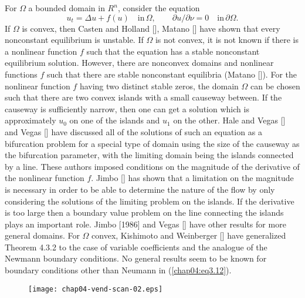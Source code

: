 \documentclass{surv-l}
\theoremstyle{plain}
\theoremstyle{definition}
\numberwithin{equation}{section}
\numberwithin{figure}{chapter}
\renewcommand\theequation{\arabic{section}.\arabic{equation}}
\begin{document}
For $\Omega$ a bounded domain in $R^{n}$, consider the equation
\renewcommand\theequation{\arabic{section}.\arabic{equation}}
\begin{equation}\label{chap04:eq3.12}
u_{t}=\Delta u+f(u)\quad \mathrm{in}\, \Omega,\qquad \partial u/\partial \nu=0\quad \mathrm{in}\, \partial\Omega.
\end{equation}
If $\Omega$ is convex, then Casten and Holland [\citeyear{1978ch}], Matano [\citeyear{1979m}] have shown that every nonconstant equilibrium is unstable. If $\Omega$ is not convex, it is not known if there is a nonlinear function $f$ such that the equation has a stable nonconstant equilibrium solution. However, there are nonconvex domains and nonlinear functions $f$ such that there are stable nonconstant equilibria (Matano [\citeyear{1979m}]). For the nonlinear function $f$ having two distinct stable zeros, the domain $\Omega$ can be chosen such that there are two convex islands with a small causeway between. If the causeway is sufficiently narrow, then one can get a solution which is approximately $u_{0}$ on one of the islands and $u_{1}$ on the other. Hale and Vegas [\citeyear{1984hv}] and Vegas [\citeyear{1983v}] have discussed all of the solutions of such an equation as a bifurcation problem for a special type of domain using the size of the causeway as the bifurcation parameter, with the limiting domain being the islands connected by a line. These authors imposed conditions on the magnitude of the derivative of the nonlinear function $f$. Jimbo [\citeyear{1988j}] has shown that a limitation on the magnitude is necessary in order to be able to determine the nature of the flow by only considering the solutions of the limiting problem on the islands. If the derivative is too large then a boundary value problem on the line connecting the islands plays an important role. Jimbo [1986] and Vegas [\citeyear{1986v}] have other results for more general domains. For $\Omega$ convex, Kishimoto and Weinberger [\citeyear{1985kw}] have generalized Theorem 4.3.2 to the case of variable coefficients and the analogue of the Newmann boundary conditions. No general results seem to be known for boundary conditions other than Neumann in (\ref{chap04:eq3.12}).

\setcounter{figure}{0}
\renewcommand\thefigure{\arabic{section}.\arabic{figure}}
\begin{figure}
\texttt{[image: chap04-vend-scan-02.eps]}
\caption{}
\label{fig3.1}
\end{figure}
\end{document}
